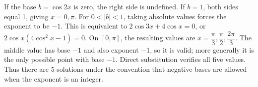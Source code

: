 If the base $b=\cos2x$ is zero, the right side is undefined. If $b=1$, both sides equal 1, giving $x=0,\pi$. For $0<|b|<1$, taking absolute values forces the exponent to be $-1$. This is equivalent to $2\cos3x+4\cos x=0$, or $2\cos x(4\cos^2x-1)=0$. On $[0,\pi]$, the resulting values are $x = \dfrac{\pi}{3} , \dfrac{\pi}{2} , \dfrac{2 \pi}{3}$. The middle value has base $-1$ and also exponent $-1$, so it is valid; more generally it is the only possible point with base $-1$. Direct substitution verifies all five values. Thus there are $\boxed5$ solutions under the convention that negative bases are allowed when the exponent is an integer.
